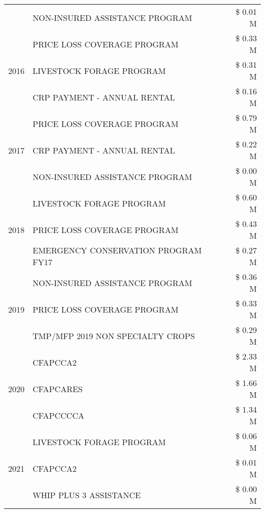 \begin{tabular}{llr}
 & NON-INSURED ASSISTANCE PROGRAM & \$ 0.01 M \\
\cline{1-3}
\multirow[t]{3}{*}{2016} & PRICE LOSS COVERAGE PROGRAM & \$ 0.33 M \\
 & LIVESTOCK FORAGE PROGRAM & \$ 0.31 M \\
 & CRP PAYMENT - ANNUAL RENTAL & \$ 0.16 M \\
\cline{1-3}
\multirow[t]{3}{*}{2017} & PRICE LOSS COVERAGE PROGRAM & \$ 0.79 M \\
 & CRP PAYMENT - ANNUAL RENTAL & \$ 0.22 M \\
 & NON-INSURED ASSISTANCE PROGRAM & \$ 0.00 M \\
\cline{1-3}
\multirow[t]{3}{*}{2018} & LIVESTOCK FORAGE PROGRAM & \$ 0.60 M \\
 & PRICE LOSS COVERAGE PROGRAM & \$ 0.43 M \\
 & EMERGENCY CONSERVATION PROGRAM FY17 & \$ 0.27 M \\
\cline{1-3}
\multirow[t]{3}{*}{2019} & NON-INSURED ASSISTANCE PROGRAM & \$ 0.36 M \\
 & PRICE LOSS COVERAGE PROGRAM & \$ 0.33 M \\
 & TMP/MFP 2019 NON SPECIALTY CROPS & \$ 0.29 M \\
\cline{1-3}
\multirow[t]{3}{*}{2020} & CFAPCCA2 & \$ 2.33 M \\
 & CFAPCARES & \$ 1.66 M \\
 & CFAPCCCCA & \$ 1.34 M \\
\cline{1-3}
\multirow[t]{3}{*}{2021} & LIVESTOCK FORAGE PROGRAM & \$ 0.06 M \\
 & CFAPCCA2 & \$ 0.01 M \\
 & WHIP PLUS 3 ASSISTANCE & \$ 0.00 M \\
\cline{1-3}
\bottomrule
\end{tabular}

